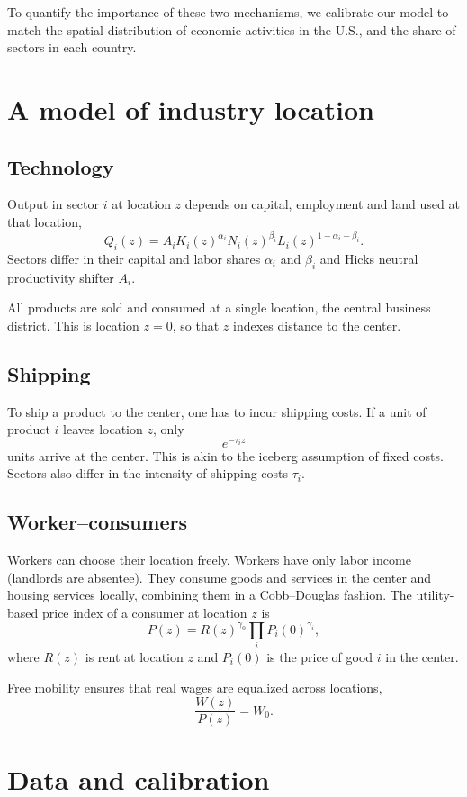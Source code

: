 \documentclass[12pt]{article}
\begin{document}
To quantify the importance of these two mechanisms, we calibrate our model to match the spatial distribution of economic activities in the U.S., and the share of sectors in each country.

\section{A model of industry location}
\subsection{Technology}
Output in sector $i$ at location $z$ depends on capital, employment and land used at that location,
\[
Q_i(z) = A_i K_i(z)^{\alpha_i}N_i(z)^{\beta_i}L_i(z)^{1-\alpha_i-\beta_i}.
\]
Sectors differ in their capital and labor shares $\alpha_i$ and $\beta_i$ and Hicks neutral productivity shifter $A_i$.

All products are sold and consumed at a single location, the central business district. This is location $z=0$, so that $z$ indexes distance to the center.

\subsection{Shipping}
To ship a product to the center, one has to incur shipping costs. If a unit of product $i$ leaves location $z$, only
\[
e^{-\tau_i z}
\]
units arrive at the center. This is akin to the iceberg assumption of fixed costs. Sectors also differ in the intensity of shipping costs $\tau_i$.

\subsection{Worker--consumers}
Workers can choose their location freely. Workers have only labor income (landlords are absentee). They consume goods and services in the center and housing services locally, combining them in a Cobb--Douglas fashion. The utility-based price index of a consumer at location $z$ is
\[
P(z) = R(z)^{\gamma_0}\prod_{i}P_i(0)^{\gamma_i},
\]
where $R(z)$ is rent at location $z$ and $P_i(0)$ is the price of good $i$ in the center.

Free mobility ensures that real wages are equalized across locations,
\[
\frac{W(z)}{P(z)} = W_0.
\]

\section{Data and calibration}
\end{document}
